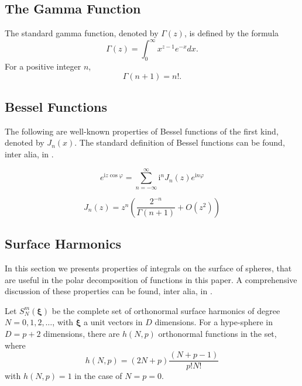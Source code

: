 \documentclass[12pt]{article}
\begin{document}
%
%
%
\subsection{The Gamma Function}

The standard gamma function, denoted by $\Gamma (z)$, is defined by the formula
\begin{equation}\label{eq:def:gammafunc}
  \Gamma(z) = \int_0^\infty x^{z-1} e^{-x} dx.
\end{equation}
For a positive integer $n$,
\begin{equation}
  \Gamma(n+1) = n!.
\end{equation}


%
%
%
\subsection{Bessel Functions}\label{sec:bessel}

The following are well-known properties of Bessel functions of the first kind, denoted by $J_n(x)$. 
The standard definition of Bessel functions can be found, inter alia, in \cite{abramowitz1964handbook}.


\begin{equation}
  e^{\mathrm{i} z \cos{\varphi}} = \sum_{n=-\infty}^\infty \mathrm{i}^n J_n(z) e^{\mathrm{i} n \varphi}
\end{equation}



\begin{equation}
 J_n(z) = z^n \left(\frac{2^{-n}}{\Gamma (n+1)}+O\left(z^2\right)\right)
\end{equation}

%
% 
%
\subsection{Surface Harmonics }\label{sec:surfaceharmonics}

In this section we presents properties of integrals on the surface of spheres, that are useful in the polar decomposition of functions
in this paper. A comprehensive discussion of these properties can be found, inter alia, in \cite{slepian1964prolate,serkh2015generalized}.

Let $S_N^m({\bm \xi})$ be the complete set of orthonormal surface harmonics of degree $N=0,1,2,\ldots$, with ${\bm \xi}$ a unit vectors in $D$ dimensions. 
For a hype-sphere in $D=p+2$ dimensions, there are $h(N,p)$ orthonormal functions in the set, where
\begin{equation}\label{eq:def:hnp}
h(N,p) = (2N+p)\frac{(N+p-1)}{p! N!}
\end{equation}
with $h(N,p)=1$ in the case of $N=p=0$.
\end{document}
